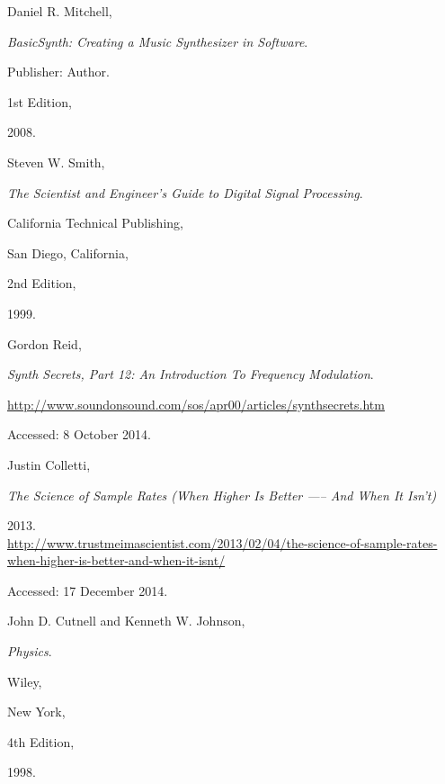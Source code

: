 \documentclass[12pt]{report}
\begin{document}
\begin{thebibliography}{99}


Daniel R. Mitchell,

\emph{BasicSynth: Creating a Music Synthesizer in Software}.

Publisher: Author.

1st Edition,

2008.


Steven W. Smith,

\emph{The Scientist and Engineer's Guide to Digital Signal Processing}.

California Technical Publishing,

San Diego, California,

2nd Edition,

1999.


Gordon Reid,

\emph{Synth Secrets, Part 12: An Introduction To Frequency Modulation}.

\url{http://www.soundonsound.com/sos/apr00/articles/synthsecrets.htm}

Accessed: 8 October 2014.


Justin Colletti,

\emph{The Science of Sample Rates (When Higher Is Better —-- And When It Isn't)}

2013.\\
  \url{http://www.trustmeimascientist.com/2013/02/04/the-science-of-sample-rates-when-higher-is-better-and-when-it-isnt/}

Accessed: 17 December 2014.


John D. Cutnell and Kenneth W. Johnson,

\emph{Physics}.

Wiley,

New York,

4th Edition,

1998.

\end{thebibliography}
\end{document}
